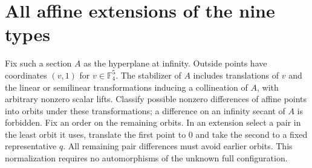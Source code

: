\documentclass[10pt]{article}
\newcommand{\F}{\mathbb F}
\begin{document}
\section{All affine extensions of the nine types}
Fix such a section $A$ as the hyperplane at infinity. Outside points have coordinates $(v,1)$ for $v\in\F_4^5$. The stabilizer of $A$ includes translations of $v$ and the linear or semilinear transformations inducing a collineation of $A$, with arbitrary nonzero scalar lifts. Classify possible nonzero differences of affine points into orbits under these transformations; a difference on an infinity secant of $A$ is forbidden. Fix an order on the remaining orbits. In an extension select a pair in the least orbit it uses, translate the first point to $0$ and take the second to a fixed representative $q$. All remaining pair differences must avoid earlier orbits. This normalization requires no automorphisms of the unknown full configuration.
\end{document}
